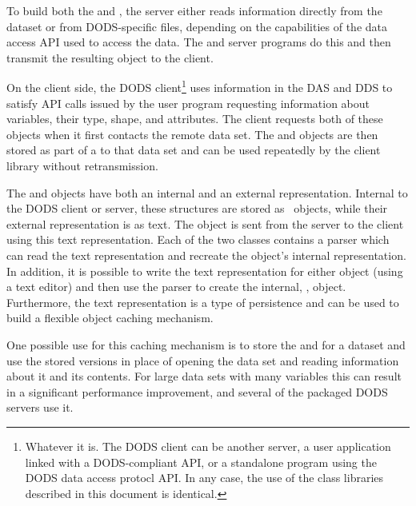 To build both the  and , the server either reads
information directly from the dataset or from DODS-specific
 files, depending on the capabilities of the data
access API used to access the data.  The  and 
server  programs do this and then transmit the resulting
object to the client.

On the client side, the DODS client\footnote{Whatever it is.  The DODS
  client can be another server, a user application linked with a
  DODS-compliant API, or a standalone program using the DODS data
  access protocl API.  In any case, the use of the class libraries
  described in this document is identical.} uses information in the
DAS and DDS to satisfy API calls issued by the user program requesting
information about variables, their type, shape, and attributes.  The
client requests both of these objects when it first contacts
the remote data set. The  and  objects are then
stored as part of a  to that data set and can
be used repeatedly by the client library without retransmission.

The  and  objects have both an internal and an
external representation. Internal to the DODS client or server, these
structures are stored as \Cpp\ objects, while their external
representation is as text. The object is sent from the server to the
client using this text representation. Each of the two classes
contains a parser which can read the text representation and recreate
the object's internal representation. In addition, it is possible to
write the text representation for either object (using a text editor)
and then use the parser to create the internal, \Cpp, object.
Furthermore, the text representation is a type of persistence and can
be used to build a flexible object caching mechanism.

One possible use for this caching mechanism is to store the  and
 for a dataset and use the stored versions in place of opening the
data set and reading information about it and its contents. For large
data sets with many variables this can result in a significant
performance improvement, and several of the packaged DODS servers use
it.  

